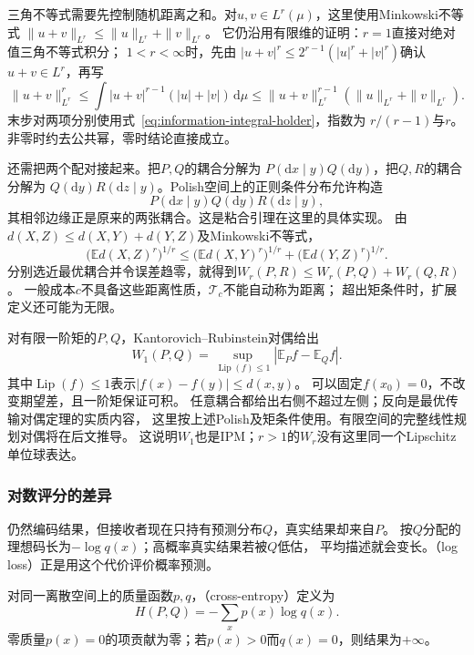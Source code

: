 三角不等式需要先控制随机距离之和。对\(u,v\in L^r(\mu)\)，这里使用Minkowski不等式
\(\|u+v\|_{L^r}\leq\|u\|_{L^r}+\|v\|_{L^r}\)。
它仍沿用有限维的证明：\(r=1\)直接对绝对值三角不等式积分；
\(1<r<\infty\)时，先由
\(|u+v|^r\leq2^{r-1}(|u|^r+|v|^r)\)确认\(u+v\in L^r\)，再写
\[
 \|u+v\|_{L^r}^r
 \leq\int|u+v|^{r-1}(|u|+|v|)\,\mathrm d\mu
 \leq\|u+v\|_{L^r}^{r-1}(\|u\|_{L^r}+\|v\|_{L^r}).
\]
末步对两项分别使用式~\eqref{eq:information-integral-holder}，指数为
\(r/(r-1)\)与\(r\)。非零时约去公共幂，零时结论直接成立。

还需把两个配对接起来。把\(P,Q\)的耦合分解为
\(P(\mathrm dx\mid y)Q(\mathrm dy)\)，把\(Q,R\)的耦合分解为
\(Q(\mathrm dy)R(\mathrm dz\mid y)\)。Polish空间上的正则条件分布允许构造
\[
  P(\mathrm dx\mid y)Q(\mathrm dy)R(\mathrm dz\mid y),
\]
其相邻边缘正是原来的两张耦合。这是粘合引理在这里的具体实现。
由\(d(X,Z)\leq d(X,Y)+d(Y,Z)\)及Minkowski不等式，
\[
  \bigl(\mathbb E d(X,Z)^r\bigr)^{1/r}
  \leq\bigl(\mathbb E d(X,Y)^r\bigr)^{1/r}
       +\bigl(\mathbb E d(Y,Z)^r\bigr)^{1/r}.
\]
分别选近最优耦合并令误差趋零，就得到\(W_r(P,R)\leq W_r(P,Q)+W_r(Q,R)\)。
一般成本\(c\)不具备这些距离性质，\(\mathcal T_c\)不能自动称为距离；
超出矩条件时，扩展定义还可能为无限。

对有限一阶矩的\(P,Q\)，Kantorovich--Rubinstein对偶给出
\begin{equation}
  W_1(P,Q)=\sup_{\operatorname{Lip}(f)\leq1}
                         |\mathbb E_Pf-\mathbb E_Qf|.
  \label{eq:information-kr-duality}
\end{equation}
其中\(\operatorname{Lip}(f)\leq1\)表示\(|f(x)-f(y)|\leq d(x,y)\)。
可以固定\(f(x_0)=0\)，不改变期望差，且一阶矩保证可积。
任意耦合都给出右侧不超过左侧；反向是最优传输对偶定理的实质内容，
这里按上述Polish及矩条件使用。有限空间的完整线性规划对偶将在后文推导。
这说明\(W_1\)也是IPM；\(r>1\)的\(W_r\)没有这里同一个Lipschitz单位球表达。

\subsubsection{对数评分的差异}
\label{sec:information-log-score-kl}

仍然编码结果，但接收者现在只持有预测分布\(Q\)，真实结果却来自\(P\)。
按\(Q\)分配的理想码长为\(-\log q(x)\)；高概率真实结果若被\(Q\)低估，
平均描述就会变长。（log loss）正是用这个代价评价概率预测。

\begin{definition}[离散交叉熵]
\label{def:information-cross-entropy}
对同一离散空间上的质量函数\(p,q\)，（cross-entropy）定义为
\begin{equation}
  H(P,Q)=-\sum_xp(x)\log q(x).
  \label{eq:information-cross-entropy}
\end{equation}
零质量\(p(x)=0\)的项贡献为零；若\(p(x)>0\)而\(q(x)=0\)，则结果为\(+\infty\)。
\end{definition}

